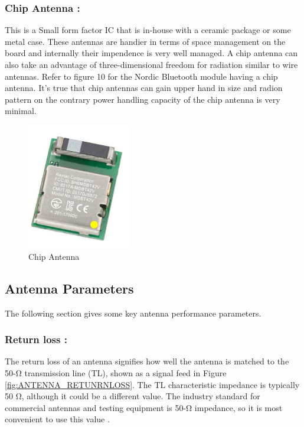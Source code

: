 \subsubsection{ Chip Antenna :} This is a Small form factor IC that is in-house with a ceramic package or some metal case.
These antennas are handier in terms of space management on the board and internally their impendence is very well managed.
A chip antenna can also take an advantage of three-dimensional freedom for radiation similar to wire antennas.
Refer to figure 10 for the Nordic Bluetooth module having a chip antenna.
It's true that chip antennas can gain upper hand in size and radion pattern on the contrary power handling capacity of the chip antenna is very minimal.
\begin{figure}[h]
	\centering
	\includegraphics[width=0.4\textwidth]{Chap03/Figures/Chip_Antenna.PNG}
	\caption{Chip Antenna}
	\label{CHIP_ANTENNA}
\end{figure}



\subsection{Antenna Parameters}

The following section gives some key antenna performance parameters.

\subsubsection{Return loss :}

The return loss of an antenna signifies how well the antenna is matched to the 50-Ω transmission line (TL), shown as a signal feed in Figure \ref{fig:ANTENNA_RETUNRNLOSS}. The TL characteristic impedance is typically 50 Ω, although it could be a different value. The industry standard for commercial antennas and testing equipment is 50-Ω impedance, so it is most convenient to use this value \cite{AN91445}. \\
	
